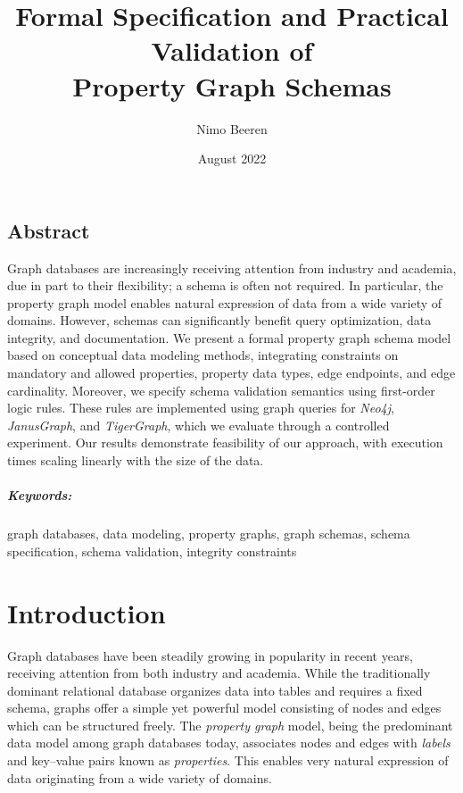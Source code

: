 \documentclass{report}
\title{Formal Specification and Practical Validation of\\Property Graph Schemas}
\author{Nimo Beeren}
\date{August 2022}
\theoremstyle{definition}
\begin{document}


\renewcommand{\thepage}{\roman{page}}

\section*{Abstract}

Graph databases are increasingly receiving attention from industry and academia, due in part to their flexibility; a schema is often not required. In particular, the property graph model enables natural expression of data from a wide variety of domains. However, schemas can significantly benefit query optimization, data integrity, and documentation. We present a formal property graph schema model based on conceptual data modeling methods, integrating constraints on mandatory and allowed properties, property data types, edge endpoints, and edge cardinality. Moreover, we specify schema validation semantics using first-order logic rules. These rules are implemented using graph queries for \emph{Neo4j}, \emph{JanusGraph}, and \emph{TigerGraph}, which we evaluate through a controlled experiment. Our results demonstrate feasibility of our approach, with execution times scaling linearly with the size of the data.

\paragraph{Keywords:} graph databases, data modeling, property graphs, graph schemas, schema specification, schema validation, integrity constraints

\tableofcontents
\listoffigures
\listoftables
\listoftheorems[title={List of Definitions}, swapnumber]
\lstlistoflistings
{}

\chapter{Introduction}
\setcounter{page}{1}
\renewcommand{\thepage}{\arabic{page}}

Graph databases have been steadily growing in popularity in recent years, receiving attention from both industry and academia. While the traditionally dominant relational database organizes data into tables and requires a fixed schema, graphs offer a simple yet powerful model consisting of nodes and edges which can be structured freely. The \emph{property graph} model, being the predominant data model among graph databases today, associates nodes and edges with \emph{labels} and key--value pairs known as \emph{properties}. This enables very natural expression of data originating from a wide variety of domains.
\end{document}
